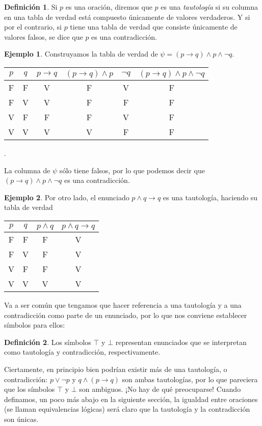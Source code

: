 \documentclass{book}
\theoremstyle{definition}
\newtheorem{df}{Definición}[chapter]
\newtheorem{ejm}{Ejemplo}[chapter]
\begin{document}
\begin{df}
	Si $p$ es una oración, diremos que $p$ es una \emph{tautología} si su columna en una tabla de verdad está compuesto únicamente de valores verdaderos.
	Y si por el contrario, si $p$ tiene una tabla de verdad que consiste únicamente de valores falsos, se dice que $p$ es una contradicción.
\end{df}

\begin{ejm}
	Construyamos la tabla de verdad de $\psi = (p\rightarrow q)\wedge p \wedge \neg q$.
		\begin{center}\begin{tabular}{|c|c||c|c|c|c|}
			\hline
			$p$ & $q$ & $p\rightarrow q$ & $\left(p\rightarrow q\right)\wedge p$ & $\neg q$& $(p\rightarrow q)\wedge p \wedge \neg q$ \\
			\hline \hline
			F & F & V & F & V & F \\
			\hline
			F & V & V & F & F & F \\
			\hline
			V & F & F & F & V & F \\
			\hline
			V & V & V & V & F & F \\
			\hline
	\end{tabular}.\end{center}
	La columna de $\psi$ sólo tiene falsos, por lo que podemos decir que $(p\rightarrow q)\wedge p \wedge \neg q$ es una contradicción.
\end{ejm}
\begin{ejm}
	Por otro lado, el enunciado $p\wedge q \rightarrow q$ es una tautología, haciendo su tabla de verdad
	\begin{center}\begin{tabular}{|c|c||c|c|}
		\hline
		$p$ & $q$ & $p \wedge q$ & $p\wedge q \rightarrow q$ \\
		\hline\hline
		F & F & F & V \\ \hline
		F & V & F & V \\ \hline
		V & F & F & V \\ \hline
		V & V & V & V \\ \hline
	\end{tabular}\end{center}
\end{ejm}

Va a ser común que tengamos que hacer referencia a una tautología y a una contradicción como parte de un enunciado, por lo que nos conviene establecer símbolos para ellos:
\begin{df}
	Los símbolos $\top$ y $\bot$ representan enunciados que se interpretan como tautología y contradicción, respectivamente.
\end{df}
Ciertamente, en principio bien podrían existir más de una tautología, o contradicción: $p\vee \neg p$ y $q \wedge (p \rightarrow q)$ son ambas tautologías, por lo que pareciera que los símbolos $\top$ y $\bot$ son ambiguos.
¡No hay de qué preocuparse! Cuando definamos, un poco más abajo en la siguiente sección, la igualdad entre oraciones (se llaman equivalencias lógicas) será claro que la tautología y la contradicción son únicas. %
\end{document}
